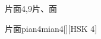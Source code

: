 \begin{entry}{片面}{4,9}{⽚、⾯}
  \begin{phonetics}{片面}{pian4mian4}[][HSK 4]
  \end{phonetics}
\end{entry}
